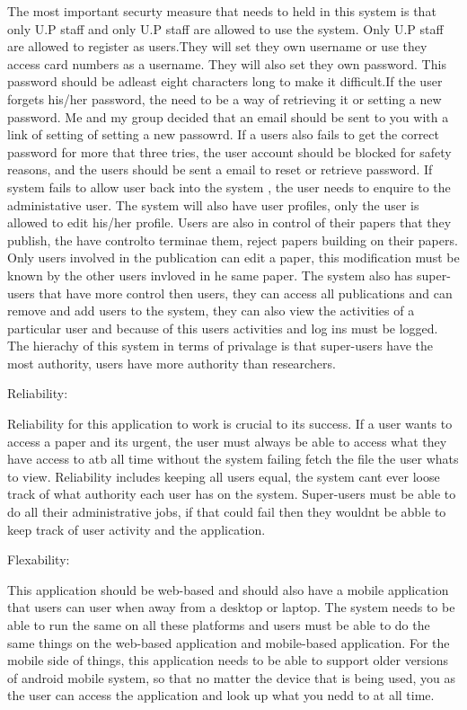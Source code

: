 \documentclass[a4paper,12pt]{report}
\begin{document}
The most important securty measure that needs to held in this system is that only U.P staff  and only U.P staff are allowed to use the system. Only U.P staff are allowed to register as users.They will set they own username or use they access card numbers as a username. They will also set they own password. This password should be adleast eight characters long to make it difficult.If the user forgets his/her password, the need to be a way of retrieving it or setting a new password. Me and my group decided that an email should be sent to you with a link of setting of setting a new passowrd. If a users also fails to get the correct password for more that three tries, the user account should be blocked for safety reasons, and the users should be sent a email to reset or retrieve password. If system fails to allow user back into the system , the user needs to enquire to the administative user. The system will also have user profiles, only the user is allowed to edit his/her profile. Users are also in control of their papers that they publish, the have controlto terminae them, reject papers building on their papers. Only users involved in the publication can edit a paper, this modification must be known by the other users invloved in he same paper. The system also has super-users that have more control then users, they can access all publications and can remove and add users to the system, they can also view the activities of a particular user and because of this users activities and log ins must be logged. The hierachy of this system in terms of privalage is that super-users have the most authority, users have more authority than researchers.

Reliability:

Reliability for this application to work is crucial to its success. If a user wants to access a paper and its urgent, the user must always be able to access what they have access to atb all time without the system failing fetch the file the user whats to view. Reliability includes keeping all users equal, the system cant ever loose track of what authority each user has on the system. Super-users must be able to do all their administrative jobs, if that could fail then they wouldnt be abble to keep track of user activity and the application. 

Flexability:

This application should be web-based and should also have a mobile application that users can user when away from a desktop or laptop. The system needs to be able to run the same on all these platforms and users must be able to do the same things on the web-based application and mobile-based application. For the mobile side of things, this application needs to be able to support older versions of android mobile system, so that no matter the device that is being used, you as the user can access the application and look up what you nedd to at all time.
\end{document}
